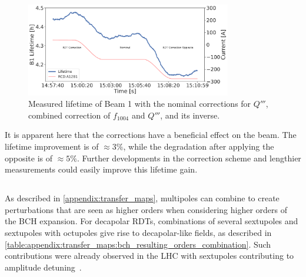 \begin{figure}[!htb]
    \centering
    \includegraphics[width=0.8\textwidth]{./images/b5_lifetime_rdt_corr.pdf}
    \caption{Measured lifetime of Beam 1 with the nominal corrections for $Q'''$, combined
    correction of $f_{1004}$ and $Q'''$, and its inverse.}
    \label{fig:decapoles:impact:b5_lifetime_rdt_corr}
\end{figure}

It is apparent here that the corrections have a beneficial effect on the beam. The lifetime
improvement is of $\approx 3 \%$, while the degradation after applying the opposite is of $\approx
5\%$. Further developments in the correction scheme and lengthier measurements could easily improve
this lifetime gain.






\subsection{}
\label{section:decapoles:feed_up}


\subsubsection{}

As described in \cref{appendix:transfer_maps}, multipoles can combine to create perturbations that
are seen as higher orders when considering higher orders of the BCH expansion.
For decapolar RDTs, combinations of several sextupoles and sextupoles with octupoles give rise to
decapolar-like fields, as described in
\cref{table:appendix:transfer_maps:bch_resulting_orders_combination}. 
Such contributions were already observed in the LHC with sextupoles contributing to amplitude
detuning~\cite{soubelet_simulations_nodate}.

